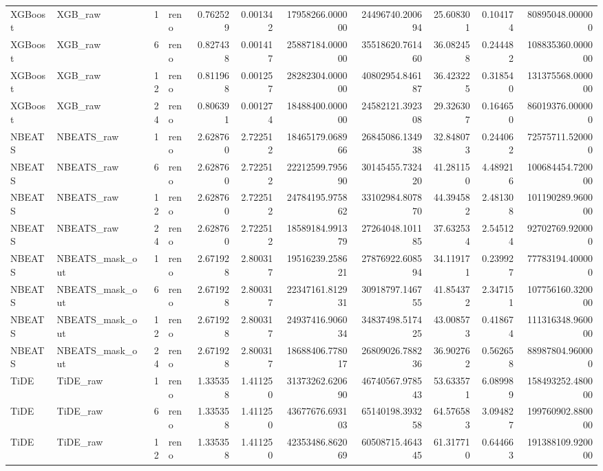 \begin{longtable}{llrlrrrrrrr}
XGBoost & XGB\_raw & 1 & reno & 0.762529 & 0.001342 & 17958266.000000 & 24496740.200694 & 25.608301 & 0.104174 & 80895048.000000 \\
XGBoost & XGB\_raw & 6 & reno & 0.827438 & 0.001417 & 25887184.000000 & 35518620.761460 & 36.082458 & 0.244482 & 108835360.000000 \\
XGBoost & XGB\_raw & 12 & reno & 0.811968 & 0.001257 & 28282304.000000 & 40802954.846187 & 36.423225 & 0.318540 & 131375568.000000 \\
XGBoost & XGB\_raw & 24 & reno & 0.806391 & 0.001274 & 18488400.000000 & 24582121.392308 & 29.326307 & 0.164650 & 86019376.000000 \\
NBEATS & NBEATS\_raw & 1 & reno & 2.628760 & 2.722512 & 18465179.068966 & 26845086.134938 & 32.848073 & 0.244062 & 72575711.520000 \\
NBEATS & NBEATS\_raw & 6 & reno & 2.628760 & 2.722512 & 22212599.795690 & 30145455.732420 & 41.281150 & 4.489216 & 100684454.720000 \\
NBEATS & NBEATS\_raw & 12 & reno & 2.628760 & 2.722512 & 24784195.975862 & 33102984.807870 & 44.394582 & 2.481308 & 101190289.960000 \\
NBEATS & NBEATS\_raw & 24 & reno & 2.628760 & 2.722512 & 18589184.991379 & 27264048.101185 & 37.632534 & 2.545124 & 92702769.920000 \\
NBEATS & NBEATS\_mask\_out & 1 & reno & 2.671928 & 2.800317 & 19516239.258621 & 27876922.608594 & 34.119171 & 0.239927 & 77783194.400000 \\
NBEATS & NBEATS\_mask\_out & 6 & reno & 2.671928 & 2.800317 & 22347161.812931 & 30918797.146755 & 41.854372 & 2.347151 & 107756160.320000 \\
NBEATS & NBEATS\_mask\_out & 12 & reno & 2.671928 & 2.800317 & 24937416.906034 & 34837498.517425 & 43.008573 & 0.418674 & 111316348.960000 \\
NBEATS & NBEATS\_mask\_out & 24 & reno & 2.671928 & 2.800317 & 18688406.778017 & 26809026.788236 & 36.902762 & 0.562658 & 88987804.960000 \\
TiDE & TiDE\_raw & 1 & reno & 1.335358 & 1.411250 & 31373262.620690 & 46740567.978543 & 53.633571 & 6.089989 & 158493252.480000 \\
TiDE & TiDE\_raw & 6 & reno & 1.335358 & 1.411250 & 43677676.693103 & 65140198.393258 & 64.576583 & 3.094827 & 199760902.880000 \\
TiDE & TiDE\_raw & 12 & reno & 1.335358 & 1.411250 & 42353486.862069 & 60508715.464345 & 61.317710 & 0.644663 & 191388109.920000 \\

\end{longtable}
